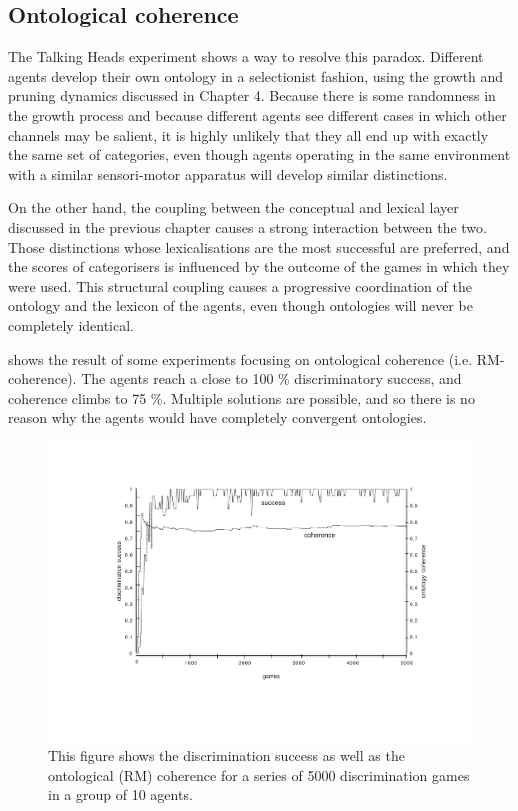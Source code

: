 \subsection{Ontological coherence}

The Talking Heads experiment shows a way to resolve
this paradox. Different agents develop their own 
ontology in a selectionist fashion,
using the growth and pruning dynamics discussed in Chapter 4. 
Because there is some randomness in the growth
process and because different agents see different cases
in which other channels may be salient, it is highly
unlikely that they all end up with exactly the same 
set of categories, even though 
agents operating in the same environment with a similar 
sensori-motor apparatus will develop similar distinctions. 

On the other hand, the coupling between the conceptual
and lexical layer discussed in the previous chapter
causes a strong interaction between the two. Those 
distinctions whose lexicalisations are the most successful 
are preferred, and the scores
of categorisers is influenced by the outcome of the 
games in which they were used. This structural coupling
causes a progressive coordination of the ontology and 
the lexicon of the agents, even though ontologies will 
never be completely identical. 

 shows the result of some experiments 
focusing on ontological coherence (i.e. RM-coherence). 
The agents reach a close to 100 \% discriminatory 
success, and coherence climbs to 75 \%. 
Multiple solutions are possible, and so there is no reason why the 
agents would have completely convergent ontologies.

\begin{figure}[htbp]
  \centerline{\includegraphics[width=.80\textwidth]{chap7/figs/coh.pdf}}
\caption{\label{coh}This figure shows the discrimination
success as well as the ontological (RM) coherence for
a series of 5000 discrimination games in a group of 10 agents.}
\end{figure}

